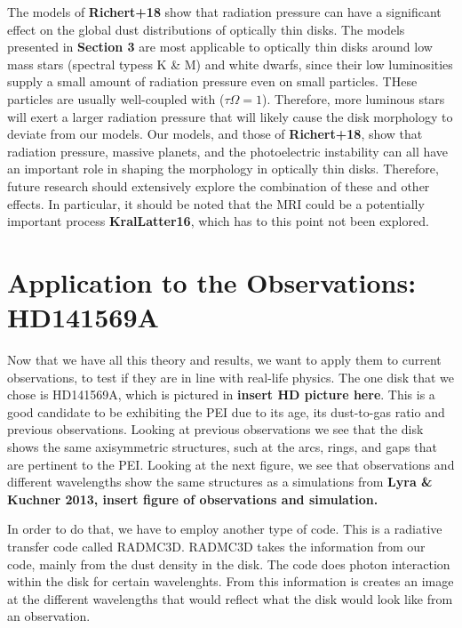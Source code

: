 \documentclass[onecolumn]{report}
\begin{document}
The models of \textbf{Richert+18} show that radiation pressure can have a significant effect on the global dust distributions of optically thin disks. The models presented in \textbf{Section 3} are most applicable to optically thin disks around low mass stars (spectral typess K \& M) and white dwarfs, since their low luminosities supply a small amount of radiation pressure even on small particles. THese particles are usually well-coupled with ($\tau\Omega = 1$). Therefore, more luminous stars will exert a larger radiation pressure that will likely cause the disk morphology to deviate from our models. Our models, and those of \textbf{Richert+18}, show that radiation pressure, massive planets, and the photoelectric instability can all have an important role in shaping the morphology in optically thin disks. Therefore, future research should extensively explore the combination of these and other effects. In particular, it should be noted that the MRI could be a potentially important process \textbf{KralLatter16}, which has to this point not been explored. 

\chapter{Application to the Observations: HD141569A}

Now that we have all this theory and results, we want to apply them to current observations, to test if they are in line with real-life physics. The one disk that we chose is HD141569A, which is pictured in \textbf{insert HD picture here}. This is a good candidate to be exhibiting the PEI due to its age, its dust-to-gas ratio and previous observations. Looking at previous observations we see that the disk shows the same axisymmetric structures, such at the arcs, rings, and gaps that are pertinent to the PEI. Looking at the next figure, we see that observations and different wavelengths show the same structures as a simulations from \textbf{Lyra \& Kuchner 2013, insert figure of observations and simulation.}



In order to do that, we have to employ another type of code. This is a radiative transfer code called RADMC3D. RADMC3D takes the information from our code, mainly from the dust density in the disk. The code does photon interaction within the disk for certain wavelenghts. From this information is creates an image at the different wavelengths that would reflect what the disk would look like from an observation.
\end{document}
